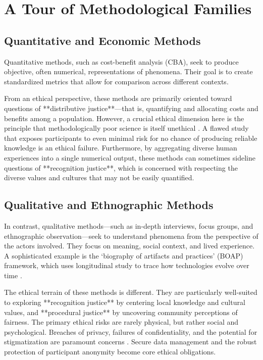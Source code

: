 \documentclass[11pt, letterpaper]{article}
\begin{document}
\section{A Tour of Methodological Families}

\subsection{Quantitative and Economic Methods}

Quantitative methods, such as cost-benefit analysis (CBA), seek to produce objective, often numerical, representations of phenomena. Their goal is to create standardized metrics that allow for comparison across different contexts.

From an ethical perspective, these methods are primarily oriented toward questions of **distributive justice**---that is, quantifying and allocating costs and benefits among a population. However, a crucial ethical dimension here is the principle that methodologically poor science is itself unethical \citep{wieten_2017}. A flawed study that exposes participants to even minimal risk for no chance of producing reliable knowledge is an ethical failure. Furthermore, by aggregating diverse human experiences into a single numerical output, these methods can sometimes sideline questions of **recognition justice**, which is concerned with respecting the diverse values and cultures that may not be easily quantified.

\subsection{Qualitative and Ethnographic Methods}

In contrast, qualitative methods---such as in-depth interviews, focus groups, and ethnographic observation---seek to understand phenomena from the perspective of the actors involved. They focus on meaning, social context, and lived experience. A sophisticated example is the `biography of artifacts and practices' (BOAP) framework, which uses longitudinal study to trace how technologies evolve over time \citep{hyysalo_pollock_williams_2019}.

The ethical terrain of these methods is different. They are particularly well-suited to exploring **recognition justice** by centering local knowledge and cultural values, and **procedural justice** by uncovering community perceptions of fairness. The primary ethical risks are rarely physical, but rather social and psychological. Breaches of privacy, failures of confidentiality, and the potential for stigmatization are paramount concerns \citep{ec_2018}. Secure data management and the robust protection of participant anonymity become core ethical obligations.
\end{document}
